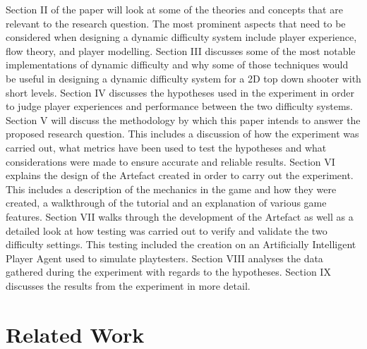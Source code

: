 \documentclass[journal]{IEEEtran}
\begin{document}
Section II of the paper will look at some of the theories and concepts that are relevant to the research question. The most prominent aspects that need to be considered when designing a dynamic difficulty system include player experience, flow theory, and player modelling. Section III discusses some of the most notable implementations of dynamic difficulty and why some of those techniques would be useful in designing a dynamic difficulty system for a 2D top down shooter with short levels. Section IV discusses the hypotheses used in the experiment in order to judge player experiences and performance between the two difficulty systems. Section V will discuss the methodology by which this paper intends to answer the proposed research question. This includes a discussion of how the experiment was carried out, what metrics have been used to test the hypotheses and what considerations were made to ensure accurate and reliable results. Section VI explains the design of the Artefact created in order to carry out the experiment. This includes a description of the mechanics in the game and how they were created, a walkthrough of the tutorial and an explanation of various game features. Section VII walks through the development of the Artefact as well as a detailed look at how testing was carried out to verify and validate the two difficulty settings. This testing included the creation on an Artificially Intelligent Player Agent used to simulate playtesters. Section VIII analyses the data gathered during the experiment with regards to the hypotheses. Section IX discusses the results from the experiment in more detail.

\section{Related Work}
\end{document}
